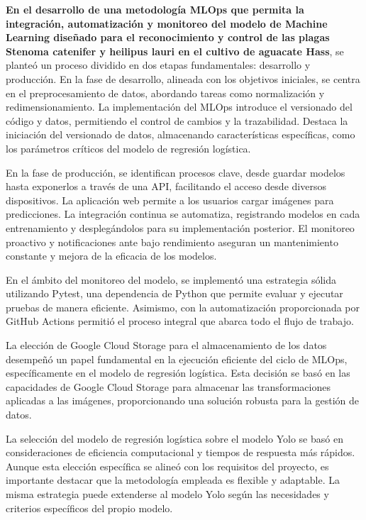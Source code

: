 \textbf{En el desarrollo de una metodología MLOps que permita la integración, automatización y monitoreo del modelo de Machine Learning diseñado para el reconocimiento y control de las plagas Stenoma catenifer y heilipus lauri en el cultivo de aguacate Hass}, se planteó un proceso dividido en dos etapas fundamentales: desarrollo y producción. En la fase de desarrollo, alineada con los objetivos iniciales, se centra en el preprocesamiento de datos, abordando tareas como normalización y redimensionamiento. La implementación del MLOps introduce el versionado del código y datos, permitiendo el control de cambios y la trazabilidad. Destaca la iniciación del versionado de datos, almacenando características específicas, como los parámetros críticos del modelo de regresión logística. 

\newpage

En la fase de producción, se identifican procesos clave, desde guardar modelos hasta exponerlos a través de una API, facilitando el acceso desde diversos dispositivos. La aplicación web permite a los usuarios cargar imágenes para predicciones. La integración continua se automatiza, registrando modelos en cada entrenamiento y desplegándolos para su implementación posterior. El monitoreo proactivo y notificaciones ante bajo rendimiento aseguran un mantenimiento constante y mejora de la eficacia de los modelos. \newline

En el ámbito del monitoreo del modelo, se implementó una estrategia sólida utilizando Pytest, una dependencia de Python que permite evaluar y ejecutar pruebas de manera eficiente. Asimismo, con la automatización proporcionada por GitHub Actions permitió el proceso integral que abarca todo el flujo de trabajo. \newline

La elección de Google Cloud Storage para el almacenamiento de los datos desempeñó un papel fundamental en la ejecución eficiente del ciclo de MLOps, específicamente en el modelo de regresión logística. Esta decisión se basó en las capacidades de Google Cloud Storage para almacenar las transformaciones aplicadas a las imágenes, proporcionando una solución robusta para la gestión de datos. \newline

La selección del modelo de regresión logística sobre el modelo Yolo se basó en consideraciones de eficiencia computacional y tiempos de respuesta más rápidos. Aunque esta elección específica se alineó con los requisitos del proyecto, es importante destacar que la metodología empleada es flexible y adaptable. La misma estrategia puede extenderse al modelo Yolo según las necesidades y criterios específicos del propio modelo.


